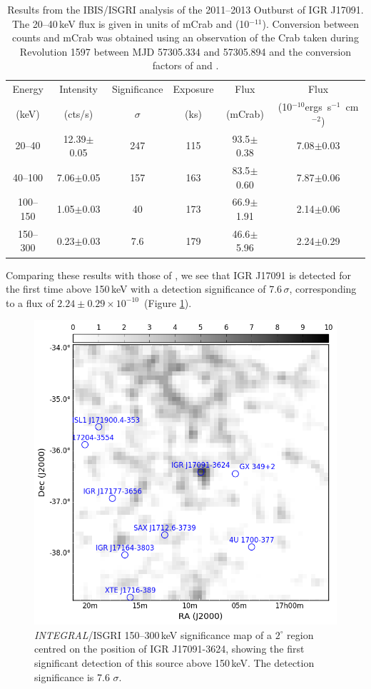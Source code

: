 \begin{table}
\begin{tabular}{cccccc}
\hline
\hline
Energy 		& Intensity 		& Significance 	& Exposure 	& Flux 				& Flux					\\
(keV)		& (cts/s)			& $\sigma$		& (ks)		& (mCrab) 			& (10$^{-10}$ergs~s$^{-1}$~cm$^{-2}$) 	\\
\hline
20--40		& 12.39$\pm$0.05	& 247			& 115		& 93.5$\pm$0.38		& 7.08$\pm$0.03			\\
40--100		& 7.06$\pm$0.05		& 157			& 163		& 83.5$\pm$0.60		& 7.87$\pm$0.06			\\
100--150	& 1.05$\pm$0.03		& 40			& 173		& 66.9$\pm$1.91		& 2.14$\pm$0.06			\\
150--300	& 0.23$\pm$0.03		& 7.6			& 179		& 46.6$\pm$5.96		& 2.24$\pm$0.29			\\	
\hline
\hline
\end{tabular}
\caption{Results from the IBIS/ISGRI analysis of the 2011--2013 Outburst of IGR J17091. The 20--40\,keV flux is given in units of mCrab and (10$^{-11}$\ergf ). Conversion between counts and mCrab was obtained using an observation of the Crab taken during Revolution 1597 between MJD 57305.334 and 57305.894 and the conversion factors of \citet{Bird_Survey} and \citet{Bazzano_Survey}.}
\label{tab:IBIS_results}
\end{table}

\par Comparing these results with those of \citet{Bazzano_Survey}, we see that IGR J17091 is detected for the first time above 150\,keV with a detection significance of 7.6\,$\sigma$, corresponding to a flux of $2.24\pm0.29\times10^{-10}$\ergf\ (Figure \ref{fig:sigmap}).

\begin{figure}
    \includegraphics[width=0.7\columnwidth, trim = 0.6cm 0 3.9cm 0]{images/sigmap.png}
    \captionsetup{singlelinecheck=off}
    \caption{\textit{INTEGRAL}/ISGRI 150--300\,keV significance map of a $2^\circ$ region centred on the position of IGR J17091-3624, showing the first significant detection of this source above 150\,keV.  The detection significance is 7.6 $\sigma$.}
   \label{fig:sigmap}
\end{figure}

